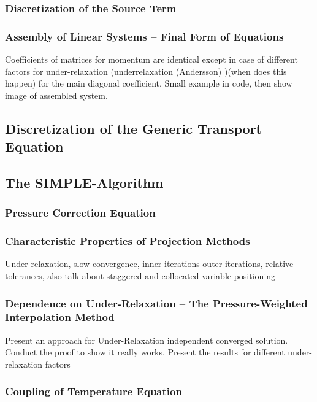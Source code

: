       \subsubsection{Discretization of the Source Term}

      \subsubsection{Assembly of Linear Systems -- Final Form of Equations}
        Coefficients of matrices for momentum are identical except in case of different factors for under-relaxation (underrelaxation (Andersson) )(when does this happen) for the main diagonal coefficient. Small example in code, then show image of assembled system.

    \subsection{Discretization of the Generic Transport Equation}

    \subsection{The SIMPLE-Algorithm}
      
      \subsubsection{Pressure Correction Equation}

      \subsubsection{Characteristic Properties of Projection Methods}

        Under-relaxation, slow convergence, inner iterations outer iterations, relative tolerances, also talk about staggered and collocated variable positioning

      \subsubsection{Dependence on Under-Relaxation -- The Pressure-Weighted Interpolation Method}

        Present an approach for Under-Relaxation independent converged solution. Conduct the proof to show it really works. Present the results for different under-relaxation factors

      \subsubsection{Coupling of Temperature Equation}


